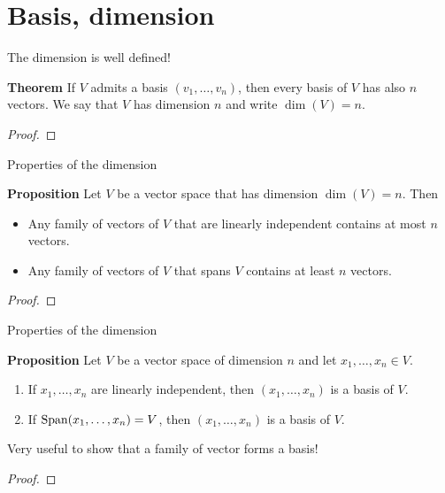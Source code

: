 \documentclass{beamer}
\begin{document}
\section{Basis, dimension}
\begin{frame}[t]{The dimension is well defined!}
	\begin{block}{\bf Theorem}
		If $V$ admits a basis $(v_1, \dots, v_n)$, then every basis of $V$ has also $n$ vectors. We say that $V$ has dimension $n$ and write $\dim(V) = n$.
	\end{block}
	\begin{proof}
		\vspace{3cm}
		\vfill
	\end{proof}
\end{frame}
\begin{frame}[t]{Properties of the dimension}
	\vspace{-0.3cm}
	\begin{block}{\bf Proposition}
		Let $V$ be a vector space that has dimension $\dim(V) = n$. Then
		\begin{itemize}
			\item Any family of vectors of $V$ that are linearly independent contains at most $n$ vectors.
			\item Any family of vectors of $V$ that spans $V$ contains at least $n$ vectors.
		\end{itemize}
	\end{block}
	\begin{proof}
		\vspace{2cm}
		\vfill
	\end{proof}
	\pause
\end{frame}

\begin{frame}[t]{Properties of the dimension}
	\vspace{-0.3cm}
	\begin{block}{\bf Proposition}
		Let $V$ be a vector space of dimension $n$ and let $x_1, \dots, x_n \in V$.
		\begin{enumerate}
			\item If $x_1, \dots, x_n$ are linearly independent, then $(x_1, \dots, x_n)$ is a basis of $V$.
			\item If ${{\rm Span}}(x_1, \dots, x_n) = V$, then $(x_1, \dots, x_n)$ is a basis of $V$.
		\end{enumerate}
	\end{block}

	\vspace{0.5cm}

	Very useful to show that a family of vector forms a basis!

	\vspace{0.5cm}

	\begin{proof}
		\vfill
	\end{proof}
\end{frame}
\end{document}
